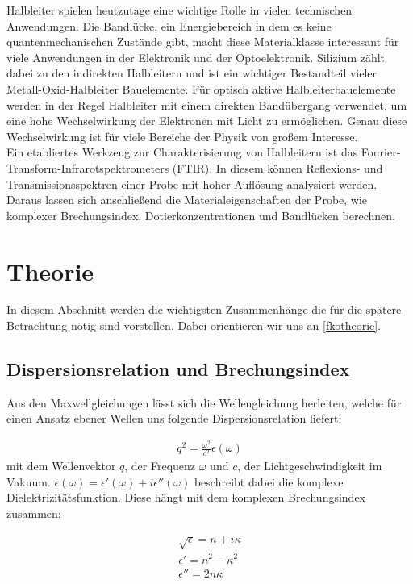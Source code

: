 \documentclass[paper=a4,fontsize=10pt,DIV=18,twocolumn,parskip=half]{scrartcl}
\numberwithin{equation}{section}    %
\begin{document}
Halbleiter spielen heutzutage eine wichtige Rolle in vielen technischen 
Anwendungen. Die Bandlücke, ein Energiebereich in dem es keine 
quantenmechanischen Zustände gibt, macht diese Materialklasse interessant für 
viele Anwendungen in der Elektronik und der Optoelektronik. Silizium zählt dabei 
zu den indirekten Halbleitern und ist ein wichtiger Bestandteil vieler 
Metall-Oxid-Halbleiter Bauelemente. Für optisch aktive Halbleiterbauelemente 
werden in der Regel Halbleiter mit einem direkten Bandübergang verwendet, um 
eine hohe Wechselwirkung der Elektronen mit Licht zu ermöglichen. Genau diese 
Wechselwirkung ist für viele Bereiche der Physik von großem Interesse. \\
Ein etabliertes Werkzeug zur Charakterisierung von Halbleitern ist das 
Fourier-Transform-Infrarotspektrometers (FTIR). In diesem können Reflexions- und 
Transmissionsspektren einer Probe mit hoher Auflösung analysiert werden. Daraus 
lassen sich anschließend die Materialeigenschaften der Probe, wie komplexer 
Brechungsindex, Dotierkonzentrationen und Bandlücken berechnen. 


\section{Theorie}
In diesem Abschnitt werden die wichtigsten Zusammenhänge die für die spätere 
Betrachtung nötig sind vorstellen. Dabei orientieren wir uns an 
\cref{fkotheorie}.

\subsection{Dispersionsrelation und Brechungsindex}

Aus den Maxwellgleichungen lässt sich die Wellengleichung herleiten, welche für 
einen Ansatz ebener Wellen uns folgende Dispersionsrelation liefert:

\begin{align}
    q^2 = \frac{\omega^2}{c^2}\epsilon(\omega)
\end{align}
mit dem Wellenvektor $q$, der Frequenz $\omega$ und $c$, der 
Lichtgeschwindigkeit im Vakuum.
$\epsilon(\omega)=\epsilon'(\omega)+i\epsilon''(\omega)$ beschreibt dabei die 
komplexe Dielektrizitätsfunktion. 
Diese hängt mit dem komplexen Brechungsindex zusammen:

\begin{align}
    \sqrt{\epsilon}=n+i\kappa \\
    \epsilon'=n^2-\kappa^2 \\
    \epsilon''=2n\kappa
    \label{diel}
\end{align}
\end{document}
